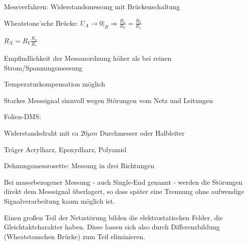 \documentclass[a4paper]{article}
\begin{document}
\begin{multicols}{3}
  Messverfahren: Widerstandsmessung mit Brückenschaltung
  \begin{itemize*}
    \item Wheatstone'sche Brücke: $U_A\rightarrow 0|_R \Rightarrow \frac{R_x}{R_V}=\frac{R_2}{R_1}$
    \item $R_X=R_V\frac{R_2}{R_1}$
  \end{itemize*}
  \begin{itemize*}
    \item Empfindlichkeit der Messanordnung höher als bei reinen Strom/Spannungsmessung
    \item Temperaturkompensation möglich
    \item Starkes Messsignal sinnvoll wegen Störungen vom Netz und Leitungen%
  \end{itemize*}

  Folien-DMS:
  \begin{itemize*}
    \item Widerstandsdraht mit ca $20\mu m$ Durchmesser oder Halbleiter
    \item Träger Acrylharz, Epoxydharz, Polyamid
    \item Dehnungsmessrosette: Messung in drei Richtungen
  \end{itemize*}

  Bei massebezogener Messung - auch Single-End genannt - werden die Störungen direkt dem Messsignal überlagert, so dass später eine Trennung ohne aufwendige Signalverarbeitung kaum möglich ist.

  Einen großen Teil der Netzstörung bilden die elektrostatischen Felder, die Gleichtaktcharakter haben. Diese lassen sich also durch Differenzbildung (Wheatstonschen Brücke) zum Teil eliminieren.


\end{multicols}
\end{document}
